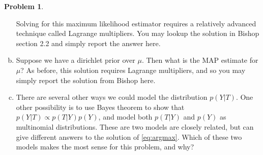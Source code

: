 \documentclass[10pt]{article}
\theoremstyle{definition}
\newtheorem{problem}{Problem}
\begin{document}
\begin{problem}
\begin{enumerate}[(a)]
            Solving for this maximum likelihood estimator requires a relatively advanced technique called Lagrange multipliers.
            You may lookup the solution in Bishop section 2.2 and simply report the answer here.

        \newpage
        \item 
            Suppose we have a dirichlet prior over $\mu$.
            Then what is the MAP estimate for $\mu$?
            As before, this solution requires Lagrange multipliers, 
            and so you may simply report the solution from Bishop here.

        \vspace{4in}
        \item
            There are several other ways we could model the distribution $p(Y|T)$.
            One other possibility is to use Bayes theorem to show that $p(Y|T)\propto p(T|Y)p(Y)$,
            and model both $p(T|Y)$ and $p(Y)$ as multinomial distributions. 
            These are two models are closely related, 
            but can give different answers to the solution of \eqref{eq:argmax}.
            Which  of these two models makes the most sense for this problem, and why?
    \end{enumerate}

\end{problem}

\end{document}
